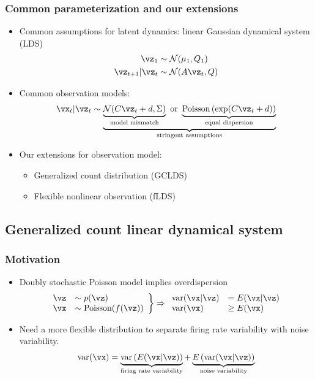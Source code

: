 \documentclass[16pt,presentation]{beamer}
\begin{document}
\begin{frame}
\frametitle{Common parameterization and our extensions}
\begin{itemize}
\item Common assumptions for latent dynamics: linear Gaussian dynamical system (LDS)
 \[\begin{split}
 \vz_{1} &\sim \N(\mu_1, Q_1)\\
 \vz_{t+1} | \vz_{t} &\sim \N(A \vz_{t}, Q)
  \end{split}\]
\item Common observation models:
 \[\vx_t | \vz_t \sim \underbrace{\underbrace{\N(C \vz_t + d, \Sigma)}_{\text{model mismatch}}
 \text{ or }
 \underbrace{\text{Poisson}\left(\exp(C \vz_t + d)\right)}_{\text{equal dispersion}}}_\text{stringent assumptions}\]
\item Our extensions for observation model:
\begin{itemize}
\item Generalized count distribution (GCLDS) \parencite{Gao2015}
\item Flexible nonlinear observation (fLDS) \parencite{gao2016linear}
\end{itemize}
\end{itemize}
\end{frame}


\subsection[]{Generalized count linear dynamical system}
\begin{frame}
\frametitle{Motivation}
\begin{itemize}
\item Doubly stochastic Poisson model implies \alert{overdispersion}
\[\left. \begin{array}{ll} \vz &\sim p(\vz) \\ \vx &\sim \text{Poisson}(f(\vz)) \end{array} \right\} \Rightarrow 
\begin{array}{ll} \text{var}(\vx | \vz) &= E(\vx | \vz) \\ \text{var}(\vx) &\geq E(\vx)  \end{array}\]
\item Need a more flexible distribution to separate \alert{firing rate variability} with \alert{noise variability}.
\[\text{var}(\vx) = \underbrace{\text{var}\left(E(\vx | \vz)\right)}_\text{firing rate variability} + \underbrace{E\left(\text{var}(\vx | \vz)\right)}_\text{noise variability}\]
\end{itemize}
\end{frame}
\end{document}
